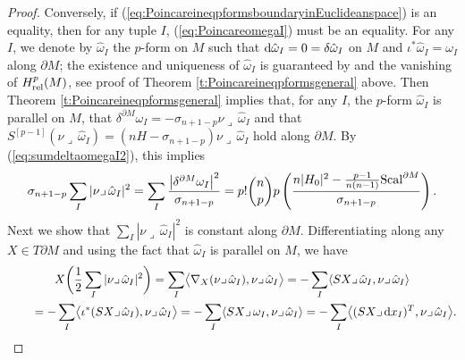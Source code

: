 \begin{proof}
Conversely, if (\ref{eq:PoincareineqpformsboundaryinEuclideanspace}) is an equality, then for any tuple $I$, (\ref{eq:PoincareomegaI}) must be an equality.
For any $I$, we denote by $\hat{\omega}_I$ the $p$-form on $M$ such that ${\rm d}\hat{\omega}_I=0=\delta\hat{\omega}_I$ on $M$ and $\iota^*\hat{\omega}_I=\omega_I$ along $\partial M$; the existence and uniqueness of $\hat{\omega}_I$ is guaranteed by \cite[Theorem 2]{DuffSpencer52} and the vanishing of  $H_{\rm rel}^p(M)$,  see proof of Theorem \ref{t:Poincareineqpformsgeneral} above. Then Theorem \ref{t:Poincareineqpformsgeneral} implies that, for any $I$, the $p$-form $\hat{\omega}_I$ is parallel on $M$, that $\delta^{\partial M}\omega_I=-\sigma_{n+1-p}\nu\lrcorner\,\hat{\omega}_I$ and that $S^{[p-1]}(\nu\lrcorner\,\hat{\omega}_I)=(nH-\sigma_{n+1-p})\nu\lrcorner\,\hat{\omega}_I$ hold along $\partial M$. By (\ref{eq:sumdeltaomegaI2}), this implies
\begin{gather}\label{eq:sumdeltaomegaI2bis}
\sigma_{n+1-p}\sum_I|\nu\lrcorner\,\hat{\omega}_I|^2=\sum_I\frac{\bigl|\delta^{\partial M}\omega_I\bigr|^2}{\sigma_{n+1-p}}
=p!\binom{n}{p}p\left(\frac{n|H_0|^2-\frac{p-1}{n(n-1)}{\rm Scal}^{\partial M}}{\sigma_{n+1-p}}\right).
\end{gather}
Next we show that $\sum_I|\nu\lrcorner\,\hat{\omega}_I|^2$ is constant along $\partial M$. Differentiating along any $X\in T\partial M$ and using the fact that $\hat{\omega}_I$ is parallel on $M$, we have
\begin{gather*}
X\biggl(\frac{1}{2}\sum_I|\nu\lrcorner\,\hat{\omega}_I|^2\biggr)
=\sum_I\bigl\langle\nabla_X(\nu\lrcorner\,\hat{\omega}_I),\nu\lrcorner\,\hat{\omega}_I\bigr\rangle
=-\sum_I\langle SX\lrcorner\,\hat{\omega}_I,\nu\lrcorner\,\hat{\omega}_I\rangle\\
\qquad{}=-\sum_I\bigl\langle \iota^*(SX\lrcorner\,\hat{\omega}_I),\nu\lrcorner\,\hat{\omega}_I\bigr\rangle
=-\sum_I\langle SX\lrcorner\,\omega_I,\nu\lrcorner\,\hat{\omega}_I\rangle
=-\sum_I\bigl\langle (SX\lrcorner\,{\rm d}x_I)^T,\nu\lrcorner\,\hat{\omega}_I\bigr\rangle.
\end{gather*}


\end{proof}
